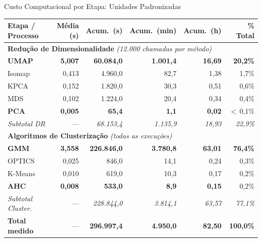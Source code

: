 \documentclass[aspectratio=169,11pt]{beamer}
\begin{document}
\begin{frame}{Custo Computacional por Etapa: Unidades Padronizadas}
  \begin{table}
    \centering
    \scriptsize
    \setlength{\tabcolsep}{6pt}
    \renewcommand{\arraystretch}{1.02}
    \begin{tabular}{lrrrrr}
      \toprule
      Etapa / Processo & Média (s) & Acum.\ (s) & Acum.\ (min) & Acum.\ (h) & \% Total \\
      \midrule
      \multicolumn{6}{l}{\textbf{Redução de Dimensionalidade} \textit{(12{.}000 chamadas por método)}} \\
      \quad \textbf{UMAP}   & \textbf{5{,}007} & \textbf{60{.}084{,}0} & \textbf{1{.}001{,}4} & \textbf{16{,}69} & \textbf{20{,}2\%} \\
      \quad Isomap          & 0{,}413          &  4{.}960{,}0          &      82{,}7          &  1{,}38          &  1{,}7\%          \\
      \quad KPCA            & 0{,}152          &  1{.}820{,}0          &      30{,}3          &  0{,}51          &  0{,}6\%          \\
      \quad MDS             & 0{,}102          &  1{.}224{,}0          &      20{,}4          &  0{,}34          &  0{,}4\%          \\
      \quad \textbf{PCA}    & \textbf{0{,}005} &     \textbf{65{,}4}   &   \textbf{1{,}1}     & \textbf{0{,}02}  & $<$\,0{,}1\%      \\
      \quad \textit{Subtotal DR} & ---         & \textit{68{.}153{,}4} & \textit{1{.}135{,}9} & \textit{18{,}93} & \textit{22{,}9\%} \\
      \midrule
      \multicolumn{6}{l}{\textbf{Algoritmos de Clusterização} \textit{(todas as execuções)}} \\
      \quad \textbf{GMM}    & \textbf{3{,}558} & \textbf{226{.}846{,}0} & \textbf{3{.}780{,}8} & \textbf{63{,}01} & \textbf{76{,}4\%} \\
      \quad OPTICS          & 0{,}025          &     846{,}0            &      14{,}1          &  0{,}24          &  0{,}3\%          \\
      \quad K-Means         & 0{,}010          &     619{,}0            &      10{,}3          &  0{,}17          &  0{,}2\%          \\
      \quad \textbf{AHC}    & \textbf{0{,}008} &     \textbf{533{,}0}   &   \textbf{8{,}9}     & \textbf{0{,}15}  &  0{,}2\%          \\
      \quad \textit{Subtotal Cluster.} & ---   & \textit{228{.}844{,}0} & \textit{3{.}814{,}1} & \textit{63{,}57} & \textit{77{,}1\%} \\
      \midrule
      \textbf{Total medido} & ---              & \textbf{296{.}997{,}4} & \textbf{4{.}950{,}0} & \textbf{82{,}50} & \textbf{100{,}0\%} \\
      \bottomrule
    \end{tabular}
  \end{table}


\end{frame}
\end{document}
